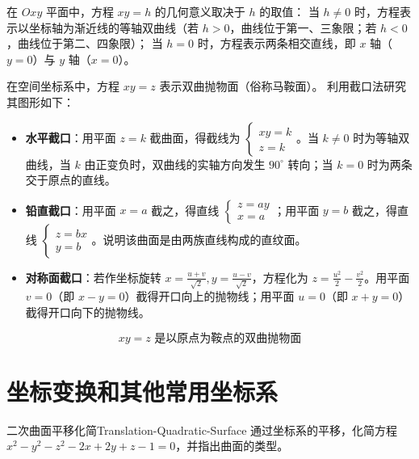 \begin{solution}

    在 $Oxy$ 平面中，方程 $xy = h$ 的几何意义取决于 $h$ 的取值：
    当 $h \neq 0$ 时，方程表示以坐标轴为渐近线的等轴双曲线（若 $h > 0$，曲线位于第一、三象限；若 $h < 0$，曲线位于第二、四象限）；
    当 $h = 0$ 时，方程表示两条相交直线，即 $x$ 轴（$y = 0$）与 $y$ 轴（$x = 0$）。


    在空间坐标系中，方程 $xy = z$ 表示双曲抛物面（俗称马鞍面）。
    利用截口法研究其图形如下：
    \begin{itemize}
        \item \textbf{水平截口}：用平面 $z = k$ 截曲面，得截线为 $\begin{cases} xy = k \\ z = k \end{cases}$。当 $k \neq 0$ 时为等轴双曲线，当 $k$ 由正变负时，双曲线的实轴方向发生 $90^\circ$ 转向；当 $k = 0$ 时为两条交于原点的直线。
        \item \textbf{铅直截口}：用平面 $x = a$ 截之，得直线 $\begin{cases} z = ay \\ x = a \end{cases}$；用平面 $y = b$ 截之，得直线 $\begin{cases} z = bx \\ y = b \end{cases}$。说明该曲面是由两族直线构成的直纹面。
        \item \textbf{对称面截口}：若作坐标旋转 $x = \frac{u+v}{\sqrt{2}}, y = \frac{u-v}{\sqrt{2}}$，方程化为 $z = \frac{u^2}{2} - \frac{v^2}{2}$。用平面 $v = 0$（即 $x-y=0$）截得开口向上的抛物线；用平面 $u = 0$（即 $x+y=0$）截得开口向下的抛物线。
    \end{itemize}
    \begin{equation*}
        \boxed{xy = z \text{ 是以原点为鞍点的双曲抛物面}}
    \end{equation*}
\end{solution}

\section{坐标变换和其他常用坐标系}

\begin{problem}{二次曲面平移化简}{Translation-Quadratic-Surface}
    通过坐标系的平移，化简方程 $x^2 - y^2 - z^2 - 2x + 2y + z - 1 = 0$，并指出曲面的类型。
\end{problem}

